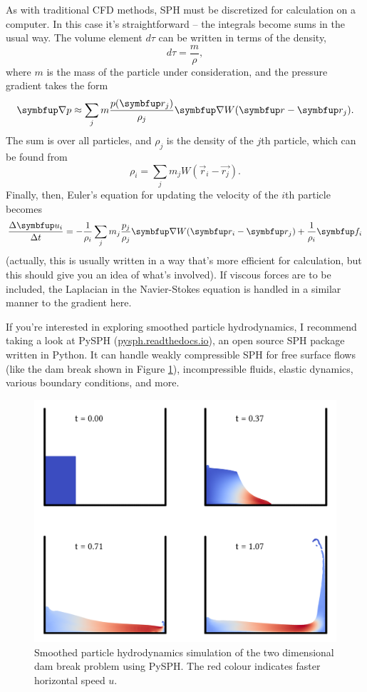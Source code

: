As with traditional CFD methods, SPH must be discretized for calculation on a computer.  In this case it's straightforward -- the integrals become sums in the usual way.  The volume element $d\tau$ can be written in terms of the density,
\[
d\tau = \frac{ m}{ \rho},
\]
where $m$ is the mass of the particle under consideration, and the pressure gradient takes the form
\[
\grad p \approx \sum_j m \frac{p(\vec{r}_j)}{\rho_j} \grad W(\vec{r} - \vec{r}_j).
\]
The sum is over all particles, and $\rho_j$ is the density of the $j$th particle, which can be found from
\[
\rho_i = \sum_j m_j W(\vec{r}_i - \vec{r_j}).
\]
Finally, then, Euler's equation for updating the velocity of the $i$th particle becomes
\begin{equation}
\frac{\Delta \vec{u}_i}{\Delta t} = -\frac{1}{\rho_i} \sum_j m_j \frac{p_j}{\rho_j} \grad W(\vec{r}_i - \vec{r}_j) + \frac{1}{\rho_i} \vec{f}_i
\end{equation}
(actually, this is usually written in a way that's more efficient for calculation, but this should give you an idea of what's involved).  If viscous forces are to be included, the Laplacian in the Navier-Stokes equation is handled in a similar manner to the gradient here.

If you're interested in exploring smoothed particle hydrodynamics, I recommend taking a look at PySPH (\href{https://pysph.readthedocs.io}{pysph.readthedocs.io}), an open source SPH package written in Python.  It can handle weakly compressible SPH for free surface flows (like the dam break shown in Figure \ref{fig_sph_dam}), incompressible fluids, elastic dynamics, various boundary conditions, and more.  


\begin{figure}
\centering
\includegraphics[width=\linewidth]{Figures/Chapter6/fig_sph_dam.png}
\caption{Smoothed particle hydrodynamics simulation of the two dimensional dam break problem using PySPH.  The red colour indicates faster horizontal speed $u$. }
\label{fig_sph_dam}
\end{figure}



